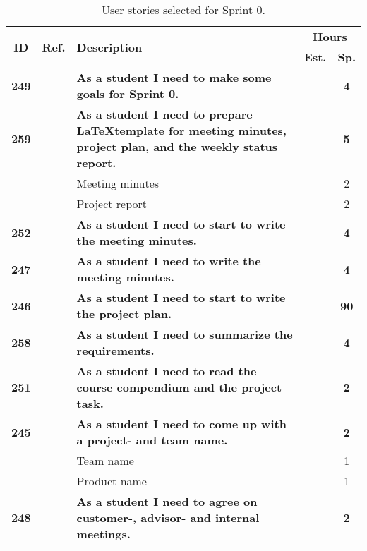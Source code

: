 \begin{table*}[!ht]
\caption{User stories selected for Sprint 0. }
\label{tab:sprint0stories}
\def\arraystretch{1.25}
\begin{tabularx}{\textwidth}{ccXcc} 
\toprule[1mm]

\multirow{2}{*}{\textbf{ID}} &
\multirow{2}{*}{\textbf{Ref.}} & \multirow{2}{*}{\textbf{Description}} & \multicolumn{2}{c}{\textbf{Hours}} \\
 					& & & \textbf{Est.} & \textbf{Sp.} \\

\midrule
\textbf{249} 	&
	& \textbf{As a student I need to make some goals for Sprint 0.} 						& 			& \textbf{4} \\
\textbf{259} 	& 
	& {\bf As a student I need to prepare \LaTeX template for meeting minutes, project plan, and the weekly status report.} 	
	& 			
	& \textbf{5} \\
		& & \hspace{2em} Meeting minutes	&  & 2 \\
		& & \hspace{2em} Project report 	&  & 2 \\
\textbf{252} 	&
	& \textbf{As a student I need to start to write the meeting minutes.} 						&  			& \textbf{4} \\

\textbf{247} 	&
	& \textbf{As a student I need to write the meeting minutes.} 						&  			& \textbf{4} \\
\textbf{246} 	&
	& \textbf{As a student I need to start to write the project plan.} 						&  			& \textbf{90} \\

\textbf{258} 	&
	& \textbf{As a student I need to summarize the requirements.} 						&  			& \textbf{4} \\
\midrule
\textbf{251} 	&
	& \textbf{As a student I need to read the course compendium and the project task.} 						& 			& \textbf{2} \\
\textbf{245} 	& 
	& \textbf{As a student I need to come up with a project- and team name.} 						& 			& \textbf{2} \\
		& & \hspace{2em} Team name &  & 1 \\
		& & \hspace{2em} Product name &  & 1 \\
\textbf{248} 	&
	& \textbf{As a student I need to agree on customer-, advisor- and internal meetings.} 						& 			& \textbf{2} \\


\end{tabularx}
\end{table*}
